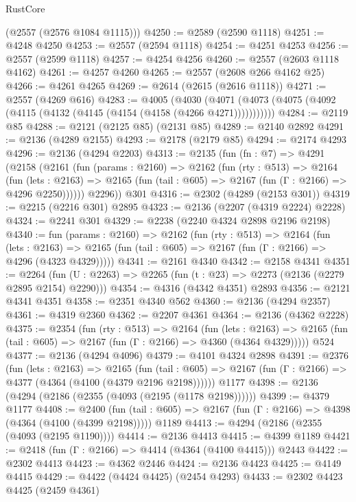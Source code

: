 \begin{lexlean}{RustCore}
\begin{coremodule}
      (@2557 (@2576 @1084 @1115)))
@4250 := @2589 (@2590 @1118)
@4251 := @4248 @4250
@4253 := @2557 (@2594 @1118)
@4254 := @4251 @4253
@4256 := @2557 (@2599 @1118)
@4257 := @4254 @4256
@4260 := @2557 (@2603 @1118 @4162)
@4261 := @4257 @4260
@4265 := @2557 (@2608 @266 @4162 @25)
@4266 := @4261 @4265
@4269 := @2614 (@2615 (@2616 @1118))
@4271 := @2557 (@4269 @616)
@4283 := @4005
    (@4030 (@4071 (@4073 (@4075 (@4092 (@4115 (@4132 (@4145 (@4154 (@4158 (@4266 @4271)))))))))))
@4284 := @2119 @85
@4288 := @2121 (@2125 @85) (@2131 @85)
@4289 := @2140 @2892
@4291 := @2136 (@4289 @2155)
@4293 := @2178 (@2179 @85)
@4294 := @2174 @4293
@4296 := @2136 (@4294 @2203)
@4313 := @2135
    (fun (fn : @7) =>
    @4291
      (@2158
        (@2161
          (fun (params : @2160) =>
          @2162
            (fun (rty : @513) =>
            @2164
              (fun (lets : @2163) =>
              @2165 (fun (tail : @605) => @2167 (fun (Γ : @2166) => @4296 @2250))))))
        @2296))
    @301
@4316 := @2302 (@4289 (@2153 @301))
@4319 := @2215 (@2216 @301) @2895
@4323 := @2136 (@2207 (@4319 @2224) @2228)
@4324 := @2241 @301
@4329 := @2238 (@2240 @4324 @2898 @2196 @2198)
@4340 := fun (params : @2160) =>
  @2162
    (fun (rty : @513) =>
    @2164
      (fun (lets : @2163) =>
      @2165 (fun (tail : @605) => @2167 (fun (Γ : @2166) => @4296 (@4323 @4329)))))
@4341 := @2161 @4340
@4342 := @2158 @4341
@4351 := @2264 (fun (U : @2263) => @2265 (fun (t : @23) => @2273 (@2136 (@2279 @2895 @2154) @2290)))
@4354 := @4316 (@4342 @4351) @2893
@4356 := @2121 @4341 @4351
@4358 := @2351 @4340 @562
@4360 := @2136 (@4294 @2357)
@4361 := @4319 @2360
@4362 := @2207 @4361
@4364 := @2136 (@4362 @2228)
@4375 := @2354
    (fun (rty : @513) =>
    @2164
      (fun (lets : @2163) =>
      @2165 (fun (tail : @605) => @2167 (fun (Γ : @2166) => @4360 (@4364 @4329)))))
    @524
@4377 := @2136 (@4294 @4096)
@4379 := @4101 @4324 @2898
@4391 := @2376
    (fun (lets : @2163) =>
    @2165
      (fun (tail : @605) => @2167 (fun (Γ : @2166) => @4377 (@4364 (@4100 (@4379 @2196 @2198))))))
    @1177
@4398 := @2136 (@4294 (@2186 (@2355 (@4093 (@2195 (@1178 @2198))))))
@4399 := @4379 @1177
@4408 := @2400
    (fun (tail : @605) => @2167 (fun (Γ : @2166) => @4398 (@4364 (@4100 (@4399 @2198)))))
    @1189
@4413 := @4294 (@2186 (@2355 (@4093 (@2195 @1190))))
@4414 := @2136 @4413
@4415 := @4399 @1189
@4421 := @2418 (fun (Γ : @2166) => @4414 (@4364 (@4100 @4415))) @2443
@4422 := @2302 @4413
@4423 := @4362 @2446
@4424 := @2136 @4423
@4425 := @4149 @4415
@4429 := @4422 (@4424 @4425) (@2454 @4293)
@4433 := @2302 @4423 @4425 (@2459 @4361)

\end{coremodule}
\end{lexlean}
